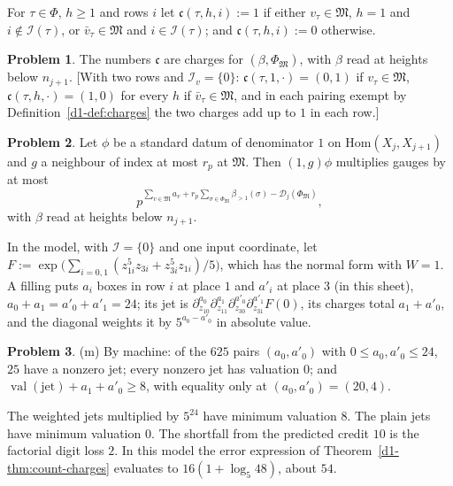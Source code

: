 \documentclass[reqno]{amsart}
\theoremstyle{plain}
\theoremstyle{definition}
\newtheorem{problem}{Problem}[section]
\theoremstyle{remark}
\newcommand{\Dc}{\mathcal D}
\newcommand{\Ic}{\mathcal I}
\newcommand{\Mk}{\mathfrak M}
\newcommand{\ch}{\mathfrak c}
\newcommand{\val}{\operatorname{val}}
\newcommand{\bl}{\beta_{>1}}
\begin{document}
For \(\tau \in \Phi\), \(h \ge 1\) and rows \(i\) let \(\ch(\tau, h, i) := 1\) if either \(v_\tau \in \Mk\), \(h = 1\) and \(i \notin \Ic(\tau)\), or \(\bar v_\tau \in \Mk\) and \(i \in \Ic(\tau)\); and \(\ch(\tau, h, i) := 0\) otherwise.

\begin{problem}\label{pr:charges-mark}
The numbers \(\ch\) are charges for \((\beta, \Phi_{\Mk})\), with \(\beta\) read at heights below \(n_{j+1}\).  [With two rows and \(\Ic_v = \{0\}\): \(\ch(\tau, 1, \cdot) = (0, 1)\) if \(v_\tau \in \Mk\), \(\ch(\tau, h, \cdot) = (1, 0)\) for every \(h\) if \(\bar v_\tau \in \Mk\), and in each pairing exempt by Definition~\ref{d1-def:charges} the two charges add up to \(1\) in each row.]
\end{problem}

\begin{problem}\label{pr:neighbour}
Let \(\phi\) be a standard datum of denominator \(1\) on \(\mathrm{Hom}(X_j, X_{j+1})\) and \(g\) a neighbour of index at most \(r_p\) at \(\Mk\).  Then \((1, g)\phi\) multiplies gauges by at most
\[
  p^{\sum_{v \in \Mk} a_v + r_p \sum_{\sigma \in \Phi_{\Mk}} \bl(\sigma) - \Dc_j(\Phi_{\Mk})} ,
\]
with \(\beta\) read at heights below \(n_{j+1}\).
\end{problem}

In the model, with \(\Ic = \{0\}\) and one input coordinate, let \(F := \exp\bigl(\sum_{i=0,1}(z_{1i}^5 z_{3i} + z_{3i}^5 z_{1i})/5\bigr)\), which has the normal form with \(W = 1\).  A filling puts \(a_i\) boxes in row \(i\) at place \(1\) and \(a'_i\) at place \(3\) (in this sheet), \(a_0 + a_1 = a'_0 + a'_1 = 24\); its jet is \(\partial_{z_{10}}^{a_0}\partial_{z_{11}}^{a_1}\partial_{z_{30}}^{a'_0}\partial_{z_{31}}^{a'_1}F(0)\), its charges total \(a_1 + a'_0\), and the diagonal weights it by \(5^{a_0 - a'_0}\) in absolute value.

\begin{problem}\label{pr:model-jets}
(m) By machine: of the \(625\) pairs \((a_0,a'_0)\) with \(0\le a_0,a'_0\le24\), \(25\) have a nonzero jet; every nonzero jet has valuation \(0\); and \(\val(\text{jet}) + a_1 + a'_0 \ge 8\), with equality only at \((a_0, a'_0) = (20, 4)\).
\end{problem}

The weighted jets multiplied by \(5^{24}\) have minimum valuation \(8\).  The plain jets have minimum valuation \(0\).  The shortfall from the predicted credit \(10\) is the factorial digit loss \(2\).  In this model the error expression of Theorem~\ref{d1-thm:count-charges} evaluates to \(16(1+\log_5 48)\), about \(54\).
\end{document}
